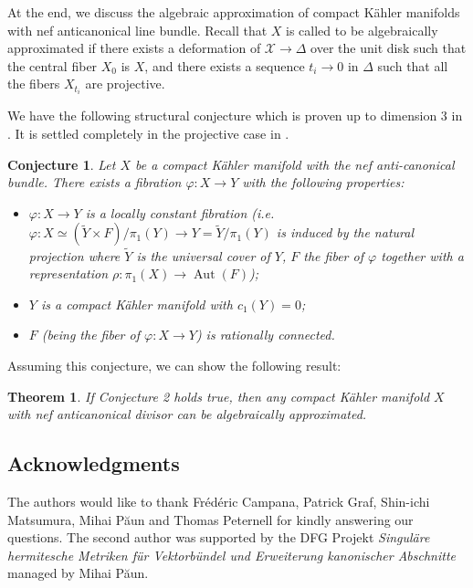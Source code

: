 \documentclass[a4, 12pt]{amsart}
\numberwithin{equation}{section}
\newtheorem{bigthm}{Theorem}
\newtheorem{bigconj}{Conjecture}
\theoremstyle{definition}
\begin{document}
At the end, we discuss the algebraic approximation of compact K\"ahler manifolds with nef anticanonical line bundle.
Recall that $X$ is called to be algebraically approximated if there exists a deformation of $\mathcal{X} \to \Delta$ over the unit disk such
that the central fiber $X_0$ is $X$, and there exists a sequence $t_i \to 0$ in $\Delta$ such that all
the fibers $X_{t_i}$ are projective.

We have the following structural conjecture which is proven up to dimension 3 in \cite{MW23}. It is settled completely in the projective case in \cite{CH19}.
\begin{bigconj}\label{conj-main}
Let $X$ be a compact K\"ahler manifold with the nef anti-canonical bundle. 
There exists a fibration $\varphi: X \to Y$ with the following properties: 
\begin{itemize}{}
\item $\varphi: X \to Y$ is a locally constant fibration (i.e. $\varphi:X \simeq (\tilde{Y} \times F)/ \pi_1(Y) \to Y=\tilde{Y}/\pi_1(Y) $ is induced by the natural projection where $\tilde{Y}$ is the universal cover of $Y$, $F$ the fiber of $\varphi$ together with a representation $\rho: \pi_1(X) \to \operatorname{Aut}(F)$); 
\item $Y$ is a compact K\"ahler manifold with $c_{1}(Y)=0$; 
\item $F$ (being the fiber of $\varphi: X \to Y$)  is rationally connected. 
\end{itemize}
\end{bigconj}

Assuming this conjecture, we can show the following result:

\begin{bigthm}
If Conjecture 2 holds true, then
any compact K\"ahler manifold $X$ with nef anticanonical divisor can be algebraically approximated.
\end{bigthm}

\subsection*{Acknowledgments}\label{subsec-ack}
The authors would like to thank Fr\'ed\'eric Campana, Patrick Graf, Shin-ichi Matsumura, Mihai P\u{a}un and Thomas Peternell for kindly answering our questions.
The second author was supported by the DFG Projekt
\emph{Singul\"are hermitesche Metriken f\"ur Vektorb\"undel und Erweiterung kanonischer Abschnitte} managed by Mihai P\u{a}un. \\
\end{document}
